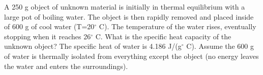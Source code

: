 \question[20] A 250 g object of unknown material is initially in thermal equilibrium with a large pot of boiling water. The object is then rapidly removed and placed inside of 600 g of cool water (T=20$^\circ$ C). The temperature of the water rises, eventually stopping when it reaches 26$^\circ$ C. What is the specific heat capacity of the unknown object? The specific heat of water is 4.186 J/(g$^\circ$ C). Assume the 600 g of water is thermally isolated from everything except the object (no energy leaves the water and enters the surroundings).
